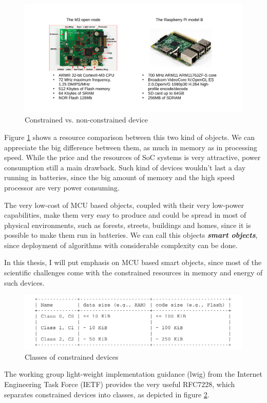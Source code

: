 \begin{figure}[htb]
	\centering
	\includegraphics[width=1\columnwidth]{chapters/background.images/BoardsComparison.pdf}
	\caption{Constrained vs. non-constrained device}
	\label{fig:BoardsComparison}
\end{figure}

Figure \ref{fig:BoardsComparison} shows a resource comparison between this two kind of objects.
We can appreciate the big difference between them, as much in memory as in processing speed.
While the price and the resources of SoC systems is very attractive, power consumption still a main drawback.
Such kind of devices wouldn't last a day running in batteries, since the big amount of memory and the high speed processor are very power consuming.

The very low-cost of MCU based objects, coupled with their very low-power capabilities, make them very easy to produce and could be spread in most of physical environments, such as forests, streets, buildings and homes, since it is possible to make them run in batteries.
We can call this objects \textit{\textbf{smart objects}}, since deployment of algorithms with considerable complexity can be done.

In this thesis, I will put emphasis on MCU based smart objects, since most of the scientific challenges come with the constrained resources in memory and energy of such devices.
\begin{figure}[htb]
	\centering
	\includegraphics[width=1\columnwidth]{chapters/background.images/DeviceClass.pdf}
	\caption{Classes of constrained devices}
	\label{fig:DeviceClass}
\end{figure}
The working group light-weight implementation guidance (lwig) from the Internet Engineering Task Force (IETF) provides the very useful RFC7228\cite{rfc7228}, which separates constrained devices into classes, as depicted in figure \ref{fig:DeviceClass}.


